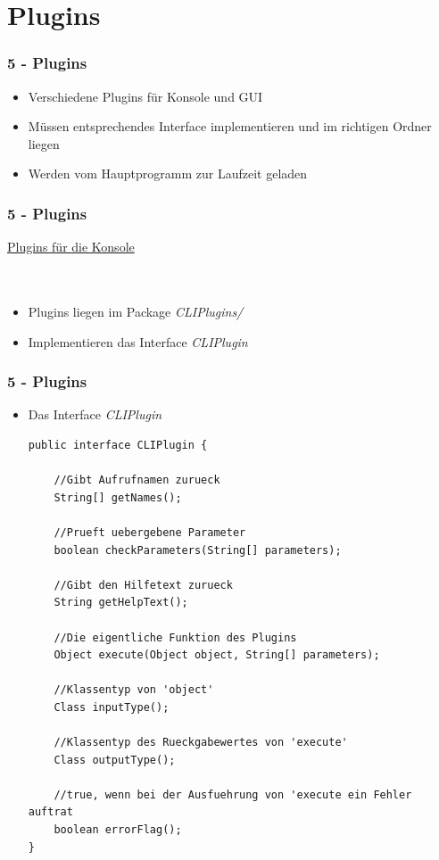 \documentclass[9pt, xcolor={dvipsnames}]{beamer}
\begin{document}

\section{Plugins}
\begin{frame}\frametitle{5 - Plugins}
	\begin{itemize}
		\item Verschiedene Plugins für Konsole und GUI
		\item Müssen entsprechendes Interface implementieren und im richtigen Ordner liegen
		\item Werden vom Hauptprogramm zur Laufzeit geladen
	\end{itemize}
\end{frame}

\begin{frame}\frametitle{5 - Plugins}
	{ \fontsize{20}{20} \selectfont \underline{Plugins für die Konsole}}
	\ \\
	\ \\
	\ \\
	\pause
	\begin{itemize}
		\item Plugins liegen im Package \textit{CLIPlugins/}
		\item Implementieren das Interface \textit{CLIPlugin}
	\end{itemize}
\end{frame}

\begin{frame}[fragile]\frametitle{5 - Plugins}
	\begin{itemize}
		\item[] Das Interface \textit{CLIPlugin}
		\pause
		\begin{lstlisting}[frame=single, basicstyle=\tiny]
public interface CLIPlugin {

	//Gibt Aufrufnamen zurueck
	String[] getNames();
	
	//Prueft uebergebene Parameter
	boolean checkParameters(String[] parameters);
	
	//Gibt den Hilfetext zurueck
	String getHelpText();
	
	//Die eigentliche Funktion des Plugins
	Object execute(Object object, String[] parameters);
	
	//Klassentyp von 'object'
	Class inputType();
	
	//Klassentyp des Rueckgabewertes von 'execute'
	Class outputType();
	
	//true, wenn bei der Ausfuehrung von 'execute ein Fehler auftrat
	boolean errorFlag();
}
		\end{lstlisting}
	\end{itemize}
\end{frame}
\end{document}
